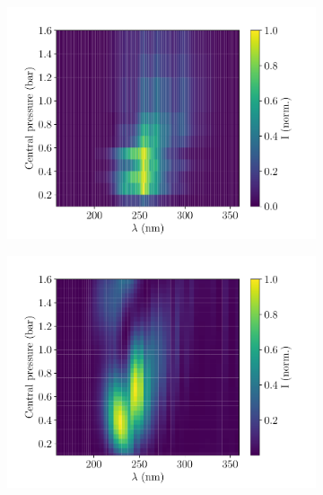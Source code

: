 \documentclass[a4paper]{jpconf}
\begin{document}
\begin{figure}[h]
\centering
 \begin{subfigure}{0.49\textwidth}
        \includegraphics[width=\textwidth]{im/2d_spectra_pres_Ar_150mW_meas}
    \caption{}
    \end{subfigure}
    \begin{subfigure}{0.49\textwidth}
        \includegraphics[width=\textwidth]{im/2d_spectra_pres_Ar_150mW_2.5scaled_grad}
    \caption{}
    \end{subfigure}   
     \begin{subfigure}{0.49\textwidth}

\end{subfigure}
\end{figure}
\end{document}
